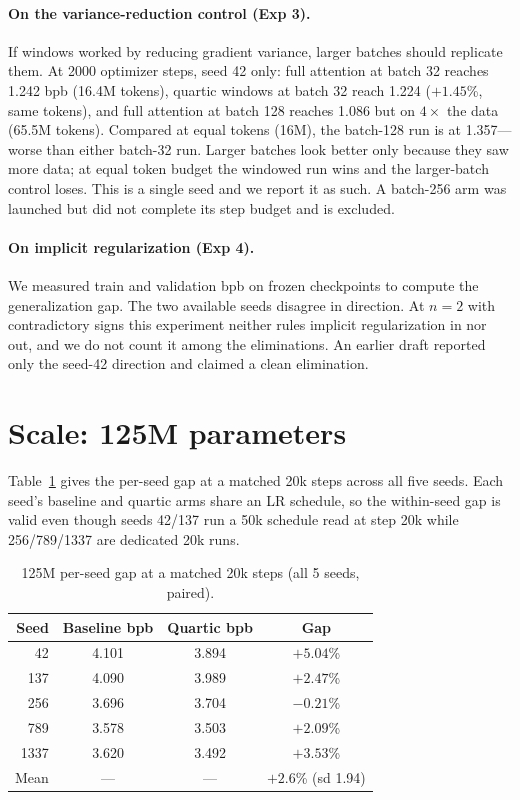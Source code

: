 \documentclass[11pt,a4paper]{article}
\begin{document}
\paragraph{On the variance-reduction control (Exp 3).} If windows worked by reducing gradient variance, larger batches should replicate them. At 2000 optimizer steps, seed 42 only: full attention at batch 32 reaches 1.242 bpb (16.4M tokens), quartic windows at batch 32 reach 1.224 ($+1.45$\%, same tokens), and full attention at batch 128 reaches 1.086 but on $4\times$ the data (65.5M tokens). Compared at equal tokens (16M), the batch-128 run is at 1.357---worse than either batch-32 run. Larger batches look better only because they saw more data; at equal token budget the windowed run wins and the larger-batch control loses. This is a single seed and we report it as such. A batch-256 arm was launched but did not complete its step budget and is excluded.

\paragraph{On implicit regularization (Exp 4).} We measured train and validation bpb on frozen checkpoints to compute the generalization gap. The two available seeds disagree in direction. At $n=2$ with contradictory signs this experiment neither rules implicit regularization in nor out, and we do not count it among the eliminations. An earlier draft reported only the seed-42 direction and claimed a clean elimination.

\section{Scale: 125M parameters}
\label{sec:scale}

Table~\ref{tab:125m_seeds} gives the per-seed gap at a matched 20k steps across all five seeds. Each seed's baseline and quartic arms share an LR schedule, so the within-seed gap is valid even though seeds 42/137 run a 50k schedule read at step 20k while 256/789/1337 are dedicated 20k runs.

\begin{table}[H]
\centering
\caption{125M per-seed gap at a matched 20k steps (all 5 seeds, paired).}
\label{tab:125m_seeds}
\begin{tabular}{rccc}
\toprule
Seed & Baseline bpb & Quartic bpb & Gap \\
\midrule
42 & 4.101 & 3.894 & $+5.04$\% \\
137 & 4.090 & 3.989 & $+2.47$\% \\
256 & 3.696 & 3.704 & $\mathbf{-0.21}$\% \\
789 & 3.578 & 3.503 & $+2.09$\% \\
1337 & 3.620 & 3.492 & $+3.53$\% \\
\midrule
Mean & --- & --- & $\mathbf{+2.6}$\% (sd 1.94) \\
\bottomrule
\end{tabular}
\end{table}
\end{document}

